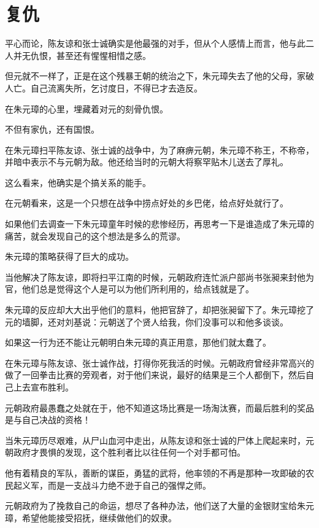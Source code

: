 \section{复仇}
\ifnum{}
	\begin{multicols}{\theparacolNo}
		\fi
		平心而论，陈友谅和张士诚确实是他最强的对手，但从个人感情上而言，他与此二人并无仇恨，甚至还有惺惺相惜之感。

		但元就不一样了，正是在这个残暴王朝的统治之下，朱元璋失去了他的父母，家破人亡。自己流离失所，乞讨度日，不得已才去造反。

		在朱元璋的心里，埋藏着对元的刻骨仇恨。

		不但有家仇，还有国恨。

		在朱元璋扫平陈友谅、张士诚的战争中，为了麻痹元朝，朱元璋不称王，不称帝，并暗中表示不与元朝为敌。他还给当时的元朝大将察罕贴木儿送去了厚礼。

		这么看来，他确实是个搞关系的能手。

		在元朝看来，这是一个只想在战争中捞点好处的乡巴佬，给点好处就行了。

		如果他们去调查一下朱元璋童年时候的悲惨经历，再思考一下是谁造成了朱元璋的痛苦，就会发现自己的这个想法是多么的荒谬。

		朱元璋的策略获得了巨大的成功。

		当他解决了陈友谅，即将扫平江南的时候，元朝政府连忙派户部尚书张昶来封他为官，他们总是觉得这个人是可以为他们所利用的，给点钱就是了。

		朱元璋的反应却大大出乎他们的意料，他把官辞了，却把张昶留下了。朱元璋挖了元的墙脚，还对刘基说：元朝送了个贤人给我，你们没事可以和他多谈谈。

		如果这一行为还不能让元朝明白朱元璋的真正用意，那他们就太蠢了。

		在朱元璋与陈友谅、张士诚作战，打得你死我活的时候。元朝政府曾经非常高兴的做了一回拳击比赛的旁观者，对于他们来说，最好的结果是三个人都倒下，然后自己上去宣布胜利。

		元朝政府最愚蠢之处就在于，他不知道这场比赛是一场淘汰赛，而最后胜利的奖品是与自己决战的资格！

		当朱元璋历尽艰难，从尸山血河中走出，从陈友谅和张士诚的尸体上爬起来时，元朝政府才畏惧的发现，这个胜利者比以往任何一个对手都可怕。

		他有着精良的军队，善断的谋臣，勇猛的武将，他率领的不再是那种一攻即破的农民起义军，而是一支战斗力绝不逊于自己的强悍之师。

		元朝政府为了挽救自己的命运，想尽了各种办法，他们送了大量的金银财宝给朱元璋，希望他能接受招抚，继续做他们的奴隶。


\end{multicols}
